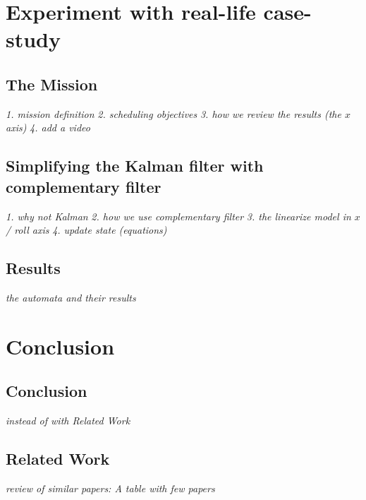 \documentclass[notes]{beamer}
\newcommand\todoil[1]{ {\color{red}\textit{#1}} }
\begin{document}
\section[Experiment]{Experiment with real-life case-study}
\subsection{The Mission}
    \todoil{1. mission definition}
    \todoil{2. scheduling objectives}
    \todoil{3. how we review the results (the $x$ axis)}
    \todoil{4. add a video}
\subsection[complementary filter]{Simplifying the Kalman filter with complementary filter}
    \todoil{1. why not Kalman}
    \todoil{2. how we use complementary filter}
    \todoil{3. the linearize model in $x$ / roll axis}
    \todoil{4. update state (equations)}
\subsection{Results}
    \todoil{the automata and their results}


\section{Conclusion}
\subsection{Conclusion}
    \todoil{instead of with Related Work}
\subsection{Related Work}
    \todoil{review of similar papers: A table with few papers}
\end{document}
